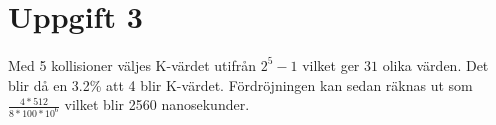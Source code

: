 \section{Uppgift 3}
\paragraph{}
Med 5 kollisioner väljes K-värdet utifrån $2^5-1$ vilket ger $31$ olika värden. Det blir då en 3.2\% att 4 blir K-värdet. Fördröjningen kan sedan räknas ut som $\frac{4*512}{8*100*10^6}$ vilket blir 2560 nanosekunder.
